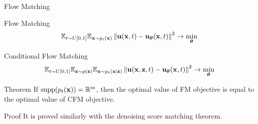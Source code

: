 \begin{frame}{Flow Matching}
	\begin{block}{Flow Matching}
		\[
			\mathbb{E}_{t \sim U[0, 1]} \mathbb{E}_{\mathbf{x} \sim p_t(\mathbf{x})}\left\| \mathbf{u}(\mathbf{x}, t) - \mathbf{u}_{\boldsymbol{\theta}}(\mathbf{x}, t) \right\|^2 \rightarrow \min_{\boldsymbol{\theta}}
		\]
	\end{block}
	\begin{block}{Conditional Flow Matching}
		\[
			\mathbb{E}_{t \sim U[0, 1]} \mathbb{E}_{\mathbf{z} \sim p(\mathbf{z})} \mathbb{E}_{\mathbf{x} \sim p_t(\mathbf{x} | \mathbf{z})}\left\| \mathbf{u}(\mathbf{x}, \mathbf{z}, t) - \mathbf{u}_{\boldsymbol{\theta}}(\mathbf{x}, t) \right\|^2 \rightarrow \min_{\boldsymbol{\theta}}
		\]
	\end{block}
	\begin{block}{Theorem}
		If $\text{supp}(p_t(\mathbf{x})) = \mathbb{R}^m$, then the optimal value of FM objective is equal to the optimal value of CFM objective.
	\end{block}
	\begin{block}{Proof}
		It is proved similarly with the denoising score matching theorem.
	\end{block}
\end{frame}
